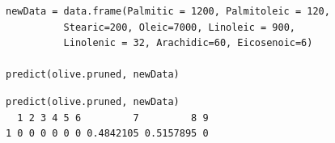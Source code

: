 \documentclass[caret-main.tex]{subfiles}
\begin{document}
\newpage
\begin{framed}
\begin{verbatim}
newData = data.frame(Palmitic = 1200, Palmitoleic = 120, 
          Stearic=200, Oleic=7000, Linoleic = 900, 
          Linolenic = 32, Arachidic=60, Eicosenoic=6)

predict(olive.pruned, newData)
\end{verbatim}
\end{framed}

\begin{verbatim}
predict(olive.pruned, newData)
  1 2 3 4 5 6         7         8 9
1 0 0 0 0 0 0 0.4842105 0.5157895 0
\end{verbatim}
\end{document}

